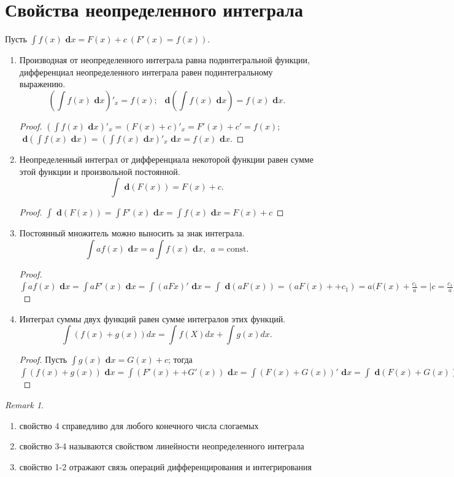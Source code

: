 \documentclass[a4paper,12pt, centered]{bookest}
\theoremstyle{remark}
\newtheorem*{remark}{Remark}
\newcommand\dx{\textbf{ d}x}
\newcommand\dy{\textbf{ d}}
\newcommand\const{\textrm{const}}
\begin{document}
\section{Свойства неопределенного интеграла}
Пусть $\int f(x)\dx=F(x)+c\>(F'(x)=f(x))$.
\begin{enumerate}
	\item Производная от неопределенного интеграла равна подинтегральной функции, дифференциал неопределенного интеграла равен подинтегральному выражению. \\
	$$(\int f(x)\dx)'_x=f(x);\>\> \dy(\int f(x)\dx)=f(x)\dx.$$
	\begin{proof}
		$(\int f(x)\dx)'_x=(F(x)+c)'_x=F'(x)+c'=f(x);$	\\$\dy(\int f(x)\dx)=(\int f(x)\dx)'_x\dx=f(x)\dx$.
	\end{proof}
	\item Неопределенный интеграл от дифференциала некоторой функции равен сумме этой функции и произвольной постоянной.
	$$\int \dy(F(x))=F(x)+c.$$
	\begin{proof}
		$\int \dy(F(x))=\int F'(x)\dx=\int f(x)\dx=F(x)+c$
	\end{proof}
	\item Постоянный множитель можно выносить за знак интеграла.
	$$\int af(x)\dx=a\int f(x)\dx,\>\> a=\const.$$
	\begin{proof}
		$\int af(x)\dx=\int a F'(x)\dx=\int(aFx)'\dx=\int \dy(aF(x))=(aF(x)++c_1)=a(F(x)+\frac{c_1}{a}=\Big|c=\frac{c_1}{a}\Big|=a(f(x)+c)=a\int f(x)\dx$
	\end{proof}
	\item Интеграл суммы двух функций равен сумме интегралов этих функций.
	$$\int(f(x)+g(x))dx=\int f(X)dx+\int g(x)dx.$$
	\begin{proof}
		Пусть $\int g(x)\dx=G(x)+c$; тогда $\int(f(x)+g(x))\dx=\int(F'(x)++G'(x))\dx=\int(F(x)+G(x))'\dx=\int \dy(F(x)+G(x))=F(x)+G(x)++c=\Big|c=c_1+c_2\Big|=(F(x)+c_1)+(G(x)c_2)=\int f(x)\dx+\int g(x)\dx$
	\end{proof}
\end{enumerate}
\begin{remark}$ $
	\begin{enumerate}
		\item[-]свойство 4 справедливо для любого конечного числа слогаемых 
		\item[-]свойство 3-4 называются свойством линейности неопределенного интеграла 
		\item[-]свойство 1-2 отражают связь операций дифференцирования и интегрирования  
	\end{enumerate}		
\end{remark}
\end{document}
